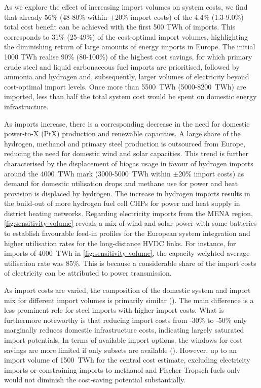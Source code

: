 As we explore the effect of increasing import volumes on system costs, we find
that already 56\% (48-80\% within $\pm$20\% import costs) of the 4.4\%
(1.3-9.0\%) total cost benefit can be achieved with the first 500 TWh of
imports. This corresponds to 31\% (25-49\%) of the cost-optimal import volumes,
highlighting the diminishing return of large amounts of energy imports in
Europe. The initial 1000 TWh realise 90\% (80-100\%) of the highest cost
savings, for which primary crude steel and liquid carbonaceous fuel imports are
prioritised, followed by ammonia and hydrogen and, subsequently, larger volumes
of electricity beyond cost-optimal import levels. Once more than 5500~TWh
(5000-8200~TWh) are imported, less than half the total system cost would be
spent on domestic energy infrastructure.

As imports increase, there is a corresponding decrease in the need for domestic
power-to-X (PtX) production and renewable capacities. A large share of the
hydrogen, methanol and primary steel production is outsourced from Europe,
reducing the need for domestic wind and solar capacities. This trend is further
characterised by the displacement of biogas usage in favour of hydrogen imports
around the 4000~TWh mark (3000-5000~TWh within $\pm$20\% import costs) as demand
for domestic  utilisation drops and methane use for power and heat
provision is displaced by hydrogen. The increase in hydrogen imports results in
the build-out of more hydrogen fuel cell CHPs for power and heat supply in
district heating networks. Regarding electricity imports from the MENA region,
\cref{fig:sensitivity-volume} reveals a mix of wind and solar power with some
batteries to establish favourable feed-in profiles for the European system
integration and higher utilisation rates for the long-distance HVDC links. For
instance, for imports of 4000~TWh in \cref{fig:sensitivity-volume}, the
capacity-weighted average utilisation rate was 85\%. This is because a
considerable share of the import costs of electricity can be attributed to power
transmission.

As import costs are varied, the composition of the domestic system and import
mix for different import volumes is primarily similar
().
The main difference is a less prominent role for steel imports with higher
import costs. What is furthermore noteworthy is that reducing import costs from
-30\% to -50\% only marginally reduces domestic infrastructure costs, indicating
largely saturated import potentials. In terms of available import options, the
windows for cost savings are more limited if only subsets are available
(). However, up to an import volume of 1500~TWh
for the central cost estimate, excluding electricity imports or constraining
imports to methanol and Fischer-Tropsch fuels only would not diminish the
cost-saving potential substantially.

